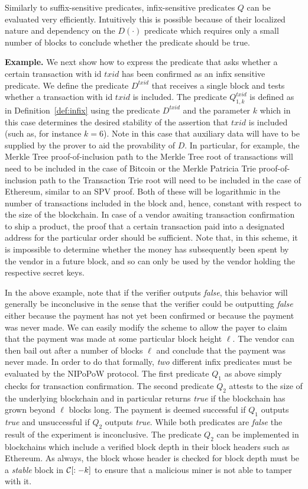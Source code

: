 Similarly to suffix-sensitive predicates, infix-sensitive predicates $Q$ can be
evaluated very efficiently. Intuitively this is possible because of their
localized nature and dependency on the $D(\cdot)$ predicate which requires only
a small number of blocks to conclude whether the predicate should be true.

\noindent\textbf{Example.}
We next show how to express the predicate that asks whether a certain
transaction with id $txid$ has been confirmed as an infix sensitive predicate.
We define the predicate $D^{txid}$ that receives a single block and tests
whether a transaction with id $txid$ is included. The predicate $Q^{txid}_{1,
k}$ is defined as in Definition~\ref{def:infix} using the predicate $D^{txid}$
and the parameter $k$ which in this case determines the desired stability of the
assertion that $txid$ is included (such as, for instance $k = 6$). Note in this
case that auxiliary data will have to be supplied by the prover to aid the
provability of $D$. In particular, for example, the Merkle Tree
proof-of-inclusion path to the Merkle Tree root of transactions will need to be
included in the case of Bitcoin or the Merkle Patricia Trie proof-of-inclusion
path to the Transaction Trie root will need to be included in the case of
Ethereum, similar to an SPV proof. Both of these will be logarithmic in the
number of transactions included in the block and, hence, constant with respect
to the size of the blockchain. In case of a vendor awaiting transaction
confirmation to ship a product, the proof that a certain transaction paid into
a designated address for the particular order should be sufficient. Note that,
in this scheme, it is impossible to determine whether the money has subsequently
been spent by the vendor in a future block, and so can only be used by the
vendor holding the respective secret keys.

In the above example, note that if the verifier outputs \emph{false}, this
behavior will generally be inconclusive in the sense that the verifier could be
outputting \emph{false} either because the payment has not yet been confirmed or
because the payment was never made. We can easily modify the scheme to allow the
payer to claim that the payment was made at some particular block height $\ell$.
The vendor can then bail out after a number of blocks $\ell$ and conclude that
the payment was never made. In order to do that formally, \emph{two} different
infix predicates must be evaluated by the NIPoPoW protocol. The first predicate
$Q_1$ as above simply checks for transaction confirmation. The second predicate
$Q_2$ attests to the size of the underlying blockchain and in particular returns
\emph{true} if the blockchain has grown beyond $\ell$ blocks long. The payment
is deemed successful if $Q_1$ outputs \emph{true} and unsuccessful if $Q_2$
outputs \emph{true}. While both predicates are \emph{false} the result of the
experiment is inconclusive. The predicate $Q_2$ can be implemented in
blockchains which include a verified block depth in their block headers such as
Ethereum. As always, the block whose header is checked for block depth must be
a \emph{stable} block in $\mathcal{C}[:-k]$ to ensure that a malicious miner is not
able to tamper with it.

